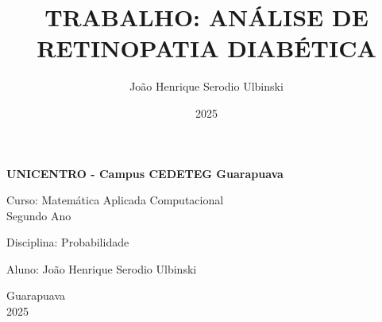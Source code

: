 \documentclass{article}
\title{\textbf{TRABALHO: ANÁLISE DE RETINOPATIA DIABÉTICA}}
\author{João Henrique Serodio Ulbinski}
\date{2025}
\begin{document}

\begin{center}
    \vspace*{\fill} %

    \Large{\textbf{UNICENTRO - Campus CEDETEG Guarapuava}} \\
    \vspace{0.5cm}

    \normalsize
    Curso: Matemática Aplicada Computacional \\
    Segundo Ano \\
    \vspace{1cm}

    \maketitle

    \vspace{1cm}
    Disciplina: Probabilidade \\
    \vspace{1cm}

    \normalsize
    Aluno: João Henrique Serodio Ulbinski \\
    \vspace*{\fill} %

    \normalsize
    Guarapuava \\
    2025

\end{center}
\end{document}
